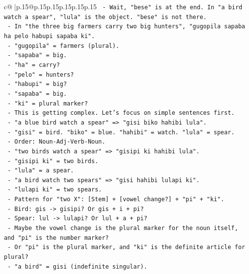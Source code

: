 \documentclass{article}
\begin{document}
{\begin{supertabular}{c@{$\;$}|p{.15\linewidth}@{}p{.15\linewidth}p{.15\linewidth}p{.15\linewidth}p{.15\linewidth}p{.15\linewidth}}
{{{\texttt{       {-} Wait, "bese" is at the end. In "a bird watch a spear", "lula" is the object. "bese" is not there.} \\
\texttt{       {-} In "the three big farmers carry two big hunters", "gugopila sapaba ha pelo habupi sapaba ki".} \\
\texttt{         {-} "gugopila" = farmers (plural).} \\
\texttt{         {-} "sapaba" = big.} \\
\texttt{         {-} "ha" = carry?} \\
\texttt{         {-} "pelo" = hunters?} \\
\texttt{         {-} "habupi" = big?} \\
\texttt{         {-} "sapaba" = big.} \\
\texttt{         {-} "ki" = plural marker?} \\
\texttt{       {-} This is getting complex. Let's focus on simple sentences first.} \\
\texttt{       {-} "a blue bird watch a spear" => "gisi biko hahibi lula".} \\
\texttt{         {-} "gisi" = bird. "biko" = blue. "hahibi" = watch. "lula" = spear.} \\
\texttt{         {-} Order: Noun{-}Adj{-}Verb{-}Noun.} \\
\texttt{       {-} "two birds watch a spear" => "gisipi ki hahibi lula".} \\
\texttt{         {-} "gisipi ki" = two birds.} \\
\texttt{         {-} "lula" = a spear.} \\
\texttt{       {-} "a bird watch two spears" => "gisi hahibi lulapi ki".} \\
\texttt{         {-} "lulapi ki" = two spears.} \\
\texttt{       {-} Pattern for "two X": {[}Stem{]} + {[}vowel change?{]} + "pi" + "ki".} \\
\texttt{         {-} Bird: gis {-}> gisipi? Or gis + i + pi?} \\
\texttt{         {-} Spear: lul {-}> lulapi? Or lul + a + pi?} \\
\texttt{         {-} Maybe the vowel change is the plural marker for the noun itself, and "pi" is the number marker?} \\
\texttt{         {-} Or "pi" is the plural marker, and "ki" is the definite article for plural?} \\
\texttt{         {-} "a bird" = gisi (indefinite singular).} \\
}}}
\end{supertabular}}
\end{document}

